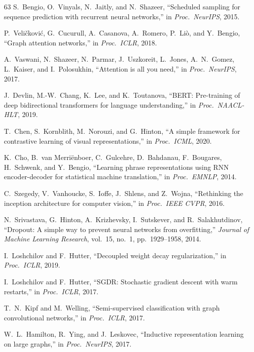 \documentclass[sigconf,nonacm]{acmart}
\begin{document}
{\begin{thebibliography}{63}
S.~Bengio, O.~Vinyals, N.~Jaitly, and N.~Shazeer, ``Scheduled sampling for sequence prediction with recurrent neural networks,'' in \emph{Proc.\ NeurIPS}, 2015.

P.~Veli\v{c}kovi\'{c}, G.~Cucurull, A.~Casanova, A.~Romero, P.~Li\`{o}, and Y.~Bengio, ``Graph attention networks,'' in \emph{Proc.\ ICLR}, 2018.

A.~Vaswani, N.~Shazeer, N.~Parmar, J.~Uszkoreit, L.~Jones, A.~N.~Gomez, L.~Kaiser, and I.~Polosukhin, ``Attention is all you need,'' in \emph{Proc.\ NeurIPS}, 2017.

J.~Devlin, M.-W.~Chang, K.~Lee, and K.~Toutanova, ``BERT: Pre-training of deep bidirectional transformers for language understanding,'' in \emph{Proc.\ NAACL-HLT}, 2019.

T.~Chen, S.~Kornblith, M.~Norouzi, and G.~Hinton, ``A simple framework for contrastive learning of visual representations,'' in \emph{Proc.\ ICML}, 2020.

K.~Cho, B.~van Merri\"{e}nboer, C.~Gulcehre, D.~Bahdanau, F.~Bougares, H.~Schwenk, and Y.~Bengio, ``Learning phrase representations using RNN encoder-decoder for statistical machine translation,'' in \emph{Proc.\ EMNLP}, 2014.

C.~Szegedy, V.~Vanhoucke, S.~Ioffe, J.~Shlens, and Z.~Wojna, ``Rethinking the inception architecture for computer vision,'' in \emph{Proc.\ IEEE CVPR}, 2016.

N.~Srivastava, G.~Hinton, A.~Krizhevsky, I.~Sutskever, and R.~Salakhutdinov, ``Dropout: A simple way to prevent neural networks from overfitting,'' \emph{Journal of Machine Learning Research}, vol.~15, no.~1, pp.~1929--1958, 2014.

I.~Loshchilov and F.~Hutter, ``Decoupled weight decay regularization,'' in \emph{Proc.\ ICLR}, 2019.

I.~Loshchilov and F.~Hutter, ``SGDR: Stochastic gradient descent with warm restarts,'' in \emph{Proc.\ ICLR}, 2017.

T.~N.~Kipf and M.~Welling, ``Semi-supervised classification with graph convolutional networks,'' in \emph{Proc.\ ICLR}, 2017.

W.~L.~Hamilton, R.~Ying, and J.~Leskovec, ``Inductive representation learning on large graphs,'' in \emph{Proc.\ NeurIPS}, 2017.


\end{thebibliography}}
\end{document}
